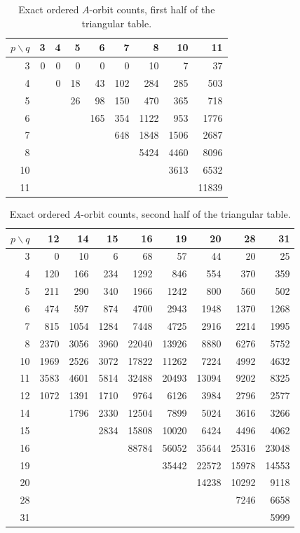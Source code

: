 \begin{table}[htbp]
\centering\small
\setlength{\tabcolsep}{5pt}
\begin{tabular}{r*{8}{r}}\toprule
$p\backslash q$&3&4&5&6&7&8&10&11\\\midrule
3&0&0&0&0&0&10&7&37\\
4&&0&18&43&102&284&285&503\\
5&&&26&98&150&470&365&718\\
6&&&&165&354&1122&953&1776\\
7&&&&&648&1848&1506&2687\\
8&&&&&&5424&4460&8096\\
10&&&&&&&3613&6532\\
11&&&&&&&&11839\\
\bottomrule\end{tabular}
\caption{Exact ordered $A$-orbit counts, first half of the triangular table.}
\label{tab:counts1}
\end{table}
\begin{table}[htbp]
\centering\small
\setlength{\tabcolsep}{5pt}
\begin{tabular}{r*{8}{r}}\toprule
$p\backslash q$&12&14&15&16&19&20&28&31\\\midrule
3&0&10&6&68&57&44&20&25\\
4&120&166&234&1292&846&554&370&359\\
5&211&290&340&1966&1242&800&560&502\\
6&474&597&874&4700&2943&1948&1370&1268\\
7&815&1054&1284&7448&4725&2916&2214&1995\\
8&2370&3056&3960&22040&13926&8880&6276&5752\\
10&1969&2526&3072&17822&11262&7224&4992&4632\\
11&3583&4601&5814&32488&20493&13094&9202&8325\\
12&1072&1391&1710&9764&6126&3984&2796&2577\\
14&&1796&2330&12504&7899&5024&3616&3266\\
15&&&2834&15808&10020&6424&4496&4062\\
16&&&&88784&56052&35644&25316&23048\\
19&&&&&35442&22572&15978&14553\\
20&&&&&&14238&10292&9118\\
28&&&&&&&7246&6658\\
31&&&&&&&&5999\\
\bottomrule\end{tabular}
\caption{Exact ordered $A$-orbit counts, second half of the triangular table.}
\label{tab:counts2}
\end{table}
